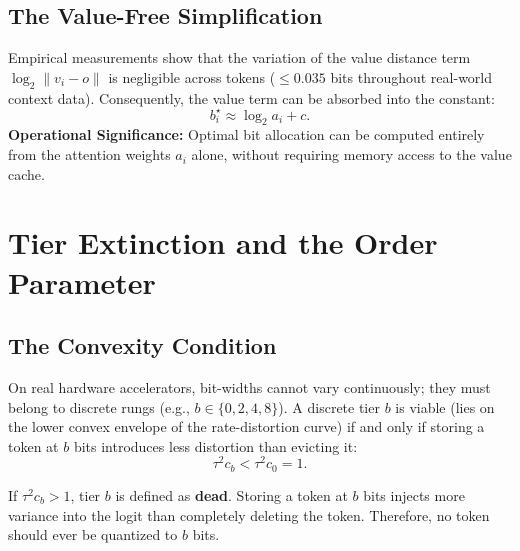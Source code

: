 \subsection{The Value-Free Simplification}
Empirical measurements show that the variation of the value distance term $\log_2 \|v_i - o\|$ is negligible across tokens ($\le 0.035$ bits throughout real-world context data). Consequently, the value term can be absorbed into the constant:
\begin{equation}
    \label{eq:practical_wf}
    b_i^\star \approx \log_2 a_i + c.
\end{equation}
\textbf{Operational Significance:} Optimal bit allocation can be computed entirely from the attention weights $a_i$ alone, without requiring memory access to the value cache.


\section{Tier Extinction and the Order Parameter}

\subsection{The Convexity Condition}
On real hardware accelerators, bit-widths cannot vary continuously; they must belong to discrete rungs (e.g., $b \in \{0, 2, 4, 8\}$). A discrete tier $b$ is viable (lies on the lower convex envelope of the rate-distortion curve) if and only if storing a token at $b$ bits introduces less distortion than evicting it:
\begin{equation}
    \tau^2 c_b < \tau^2 c_0 = 1.
\end{equation}
\begin{definition}
If $\tau^2 c_b > 1$, tier $b$ is defined as \textbf{dead}. Storing a token at $b$ bits injects more variance into the logit than completely deleting the token. Therefore, no token should ever be quantized to $b$ bits.
\end{definition}

